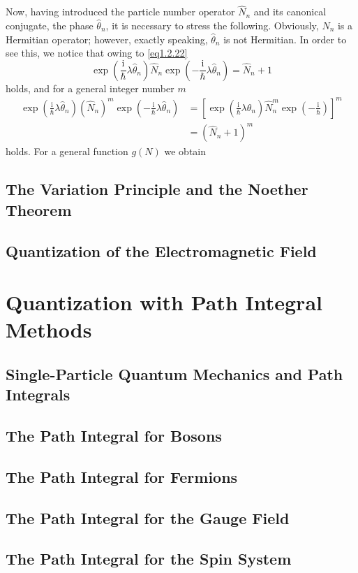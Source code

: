 \documentclass[twoside,11pt]{report}
\def\be{\begin{equation}}
\def\ee{\end{equation}}
\def\ii{\text{i}}
\begin{document}
Now, having introduced the particle number operator $\hat N_n$ and its canonical conjugate, the phase $\hat\theta_n$, it is necessary to stress the following. Obviously, $\hat N_n$ is a Hermitian operator; however, exactly speaking, $\hat\theta_n$ is not Hermitian. In order to see this, we notice that owing to \eqref{eq1.2.22}
\be
\exp\left(\frac{\ii}{\hbar}\lambda\hat\theta_n\right)\hat N_n\exp\left(-\frac{\ii}{\hbar}\lambda\hat\theta_n\right)=\hat N_n+1
\ee
holds, and for a general integer number $m$
\be\begin{split}
\exp\left(\frac{\ii}{\hbar}\lambda\hat\theta_n\right)(\hat N_n)^m\exp\left(-\frac{\ii}{\hbar}\lambda\hat\theta_n\right)&=\left[\exp\left(\frac{\ii}{\hbar}\lambda\hat\theta_n\right)\hat N_n^m\exp\left(-\frac{\ii}{\hbar}\right)\right]^m\\
&=(\hat N_n+1)^m
\end{split}\ee
holds. For a general function $g(N)$ we obtain





\section{The Variation Principle and the Noether Theorem}
\section{Quantization of the Electromagnetic Field}

\chapter{Quantization with Path Integral Methods}
\section{Single-Particle Quantum Mechanics and Path Integrals}
\section{The Path Integral for Bosons}
\section{The Path Integral for Fermions}
\section{The Path Integral for the Gauge Field}
\section{The Path Integral for the Spin System}
\end{document}
